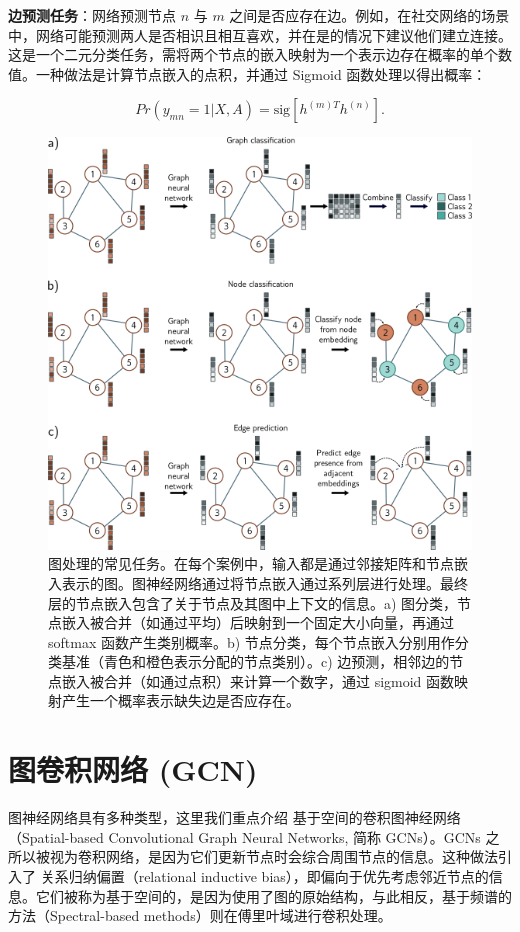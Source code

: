 \textbf{边预测任务}：网络预测节点 \(n\) 与 \(m\) 之间是否应存在边。例如，在社交网络的场景中，网络可能预测两人是否相识且相互喜欢，并在是的情况下建议他们建立连接。这是一个二元分类任务，需将两个节点的嵌入映射为一个表示边存在概率的单个数值。一种做法是计算节点嵌入的点积，并通过 Sigmoid 函数处理以得出概率：

\begin{equation}
Pr(y_{mn} = 1|X, A) = \text{sig}\left[h^{(m)T}h^{(n)} \right]. 
\end{equation}
\begin{figure}[ht!]
\centering
\includegraphics[width=0.7\linewidth]{png/chapter13/GraphProblems.png}
\caption{图处理的常见任务。在每个案例中，输入都是通过邻接矩阵和节点嵌入表示的图。图神经网络通过将节点嵌入通过系列层进行处理。最终层的节点嵌入包含了关于节点及其图中上下文的信息。a) 图分类，节点嵌入被合并（如通过平均）后映射到一个固定大小向量，再通过 softmax 函数产生类别概率。b) 节点分类，每个节点嵌入分别用作分类基准（青色和橙色表示分配的节点类别）。c) 边预测，相邻边的节点嵌入被合并（如通过点积）来计算一个数字，通过 sigmoid 函数映射产生一个概率表示缺失边是否应存在。}
\end{figure}


\section{图卷积网络 (GCN)}
图神经网络具有多种类型，这里我们重点介绍 基于空间的卷积图神经网络（Spatial-based Convolutional Graph Neural Networks, 简称 GCNs）。GCNs 之所以被视为卷积网络，是因为它们更新节点时会综合周围节点的信息。这种做法引入了 关系归纳偏置（relational inductive bias），即偏向于优先考虑邻近节点的信息。它们被称为基于空间的，是因为使用了图的原始结构，与此相反，基于频谱的方法（Spectral-based methods）则在傅里叶域进行卷积处理。

